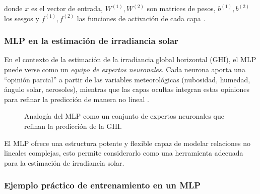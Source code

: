 donde $x$ es el vector de entrada, $W^{(1)}, W^{(2)}$ son matrices de pesos, $b^{(1)}, b^{(2)}$ los sesgos y $f^{(1)}, f^{(2)}$ las funciones de activación de cada capa \cite{ghanou2016mlp}.

\subsubsection*{MLP en la estimación de irradiancia solar}

En el contexto de la estimación de la irradiancia global horizontal (GHI), el MLP puede verse como un \textit{equipo de expertos neuronales}. Cada neurona aporta una “opinión parcial” a partir de las variables meteorológicas (nubosidad, humedad, ángulo solar, aerosoles), mientras que las capas ocultas integran estas opiniones para refinar la predicción de manera no lineal \cite{torobayona2012mlp}.  

\begin{figure} 
\centering 
{}
\caption{Analogía del MLP como un conjunto de expertos neuronales que refinan la predicción de la GHI.}
\label{fig:mlp_experts}
\end{figure}

El MLP ofrece una estructura potente y flexible capaz de modelar relaciones no lineales complejas, esto permite considerarlo como una herramienta adecuada para la estimación de irradiancia solar.

\subsubsection*{Ejemplo práctico de entrenamiento en un MLP}

